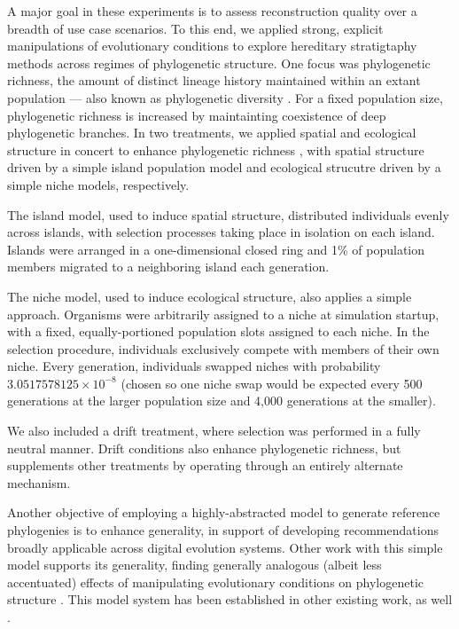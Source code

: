 A major goal in these experiments is to assess reconstruction quality over a breadth of use case scenarios.
To this end, we applied strong, explicit manipulations of evolutionary conditions to explore hereditary stratigtaphy methods across regimes of phylogenetic structure.
One focus was phylogenetic richness, the amount of distinct lineage history maintained within an extant population --- also known as phylogenetic diversity \citep{tucker2017guide}.
For a fixed population size, phylogenetic richness is increased by maintainting coexistence of deep phylogenetic branches.
In two treatments, we applied spatial and ecological structure in concert to enhance phylogenetic richness \citep{moreno2024ecology,gomez2019understanding,valiente2007facilitation}, with spatial structure driven by a simple island population model and ecological strucutre driven by a simple niche models, respectively.

The island model, used to induce spatial structure, distributed individuals evenly across islands, with selection processes taking place in isolation on each island.
Islands were arranged in a one-dimensional closed ring and 1\% of population members migrated to a neighboring island each generation.

The niche model, used to induce ecological structure, also applies a simple approach.
Organisms were arbitrarily assigned to a niche at simulation startup, with a fixed, equally-portioned population slots assigned to each niche.
In the selection procedure, individuals exclusively compete with members of their own niche.
Every generation, individuals swapped niches with probability $3.0517578125 \times 10^{-8}$ (chosen so one niche swap would be expected every 500 generations at the larger population size and 4,000 generations at the smaller). 

We also included a drift treatment, where selection was performed in a fully neutral manner.
Drift conditions also enhance phylogenetic richness, but supplements other treatments by operating through an entirely alternate mechanism.

Another objective of employing a highly-abstracted model to generate reference phylogenies is to enhance generality, in support of developing recommendations broadly applicable across digital evolution systems.
Other work with this simple model supports its generality, finding generally analogous (albeit less accentuated) effects of manipulating evolutionary conditions on phylogenetic structure \citep{moreno2024ecology}.
This model system has been established in other existing work, as well \citep{moreno2023toward}.

